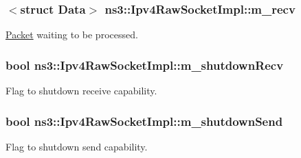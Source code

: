 \subsubsection[{\texorpdfstring{m\+\_\+recv}{m_recv}}]{$<$struct {\bf Data}$>$ ns3\+::\+Ipv4\+Raw\+Socket\+Impl\+::m\+\_\+recv\hspace{0.3cm}{\ttfamily [private]}}\hypertarget{classns3_1_1Ipv4RawSocketImpl_a460de0afa7bc2d11b5e54cf23e361173}{}\label{classns3_1_1Ipv4RawSocketImpl_a460de0afa7bc2d11b5e54cf23e361173}


\hyperlink{classns3_1_1Packet}{Packet} waiting to be processed. 

\subsubsection[{\texorpdfstring{m\+\_\+shutdown\+Recv}{m_shutdownRecv}}]{\setlength{\rightskip}{0pt plus 5cm}bool ns3\+::\+Ipv4\+Raw\+Socket\+Impl\+::m\+\_\+shutdown\+Recv\hspace{0.3cm}{\ttfamily [private]}}\hypertarget{classns3_1_1Ipv4RawSocketImpl_abb193a17208627ab4f74a9a95e0ef6e9}{}\label{classns3_1_1Ipv4RawSocketImpl_abb193a17208627ab4f74a9a95e0ef6e9}


Flag to shutdown receive capability. 

\subsubsection[{\texorpdfstring{m\+\_\+shutdown\+Send}{m_shutdownSend}}]{\setlength{\rightskip}{0pt plus 5cm}bool ns3\+::\+Ipv4\+Raw\+Socket\+Impl\+::m\+\_\+shutdown\+Send\hspace{0.3cm}{\ttfamily [private]}}\hypertarget{classns3_1_1Ipv4RawSocketImpl_adc89037fdb02fa149e063882c499dfb8}{}\label{classns3_1_1Ipv4RawSocketImpl_adc89037fdb02fa149e063882c499dfb8}


Flag to shutdown send capability. 

